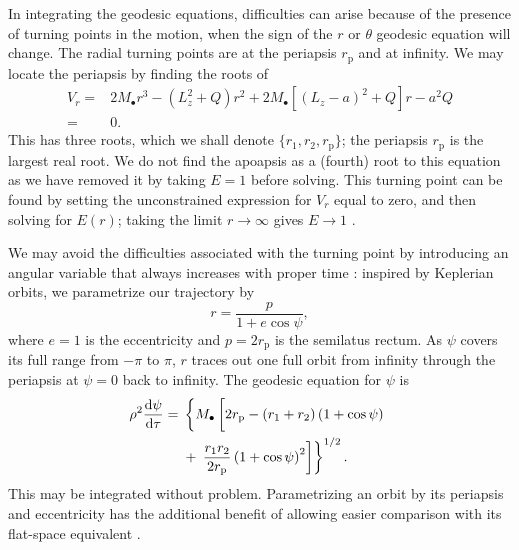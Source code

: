 \documentclass[useAMS,usedcolumn,usegraphicx,usenatbib]{mn2e}
\newcommand{\sub}[1]{\ensuremath{_\mathrm{#1}}}
\newcommand{\dd}{\ensuremath{\mathrm{d}}}
\newcommand{\diff}[2]{\ensuremath{\frac{\dd {#1}}{\dd {#2}}}}
\begin{document}
In integrating the geodesic equations, difficulties can arise because of the presence of turning points in the motion, when the sign of the $r$ or $\theta$ geodesic equation will change. The radial turning points are at the periapsis $r\sub{p}$ and at infinity. We may locate the periapsis by finding the roots of
\begin{align}
V_r = {} & 2M_\bullet r^3 - \left(L_z^2+Q\right)r^2 + 2M_\bullet\left[\left(L_z - a\right)^2 + Q\right]r - a^2 Q \nonumber \\
 = {} & 0.
\end{align}
This has three roots, which we shall denote $\{r_1, r_2, r\sub{p}\}$; the periapsis $r\sub{p}$ is the largest real root. We do not find the apoapsis as a (fourth) root to this equation as we have removed it by taking $E = 1$ before solving. This turning point can be found by setting the unconstrained expression for $V_r$ equal to zero, and then solving for $E(r)$; taking the limit $r \rightarrow \infty$ gives $E \rightarrow 1$ \citep{Wilkins1972}.

We may avoid the difficulties associated with the turning point by introducing an angular variable that always increases with proper time \citep{Drasco2004}: inspired by Keplerian orbits, we parametrize our trajectory by
\begin{equation}
r = \frac{p}{1+e\cos\psi},
\end{equation}
where $e = 1$ is the eccentricity and $p = 2r\sub{p}$ is the semilatus rectum. As $\psi$ covers its full range from $-\pi$ to $\pi$, $r$ traces out one full orbit from infinity through the periapsis at $\psi = 0$ back to infinity. The geodesic equation for $\psi$ is
\begin{align}
\rho^2 \diff{\psi}{\tau} = {} & \left\{M_\bullet\left[2r\sub{p} - \left(r_1 + r_2\right)\left(1 + \cos\psi\right) \vphantom{\frac{r_1 r_2}{2r\sub{p}}} \right.\right. \nonumber \\*
 {} & + \left.\left. \frac{r_1 r_2}{2r\sub{p}}\left(1 + \cos\psi\right)^2\right]\right\}^{1/2}.
\end{align}
This may be integrated without problem. Parametrizing an orbit by its periapsis and eccentricity has the additional benefit of allowing easier comparison with its flat-space equivalent \citep*{Gair2005}.
\end{document}
